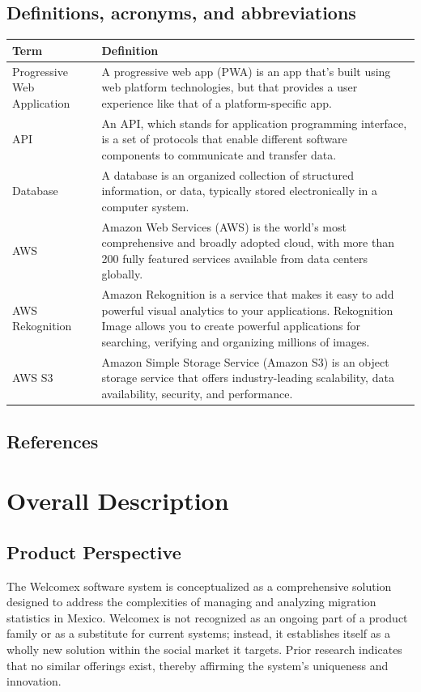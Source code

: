\documentclass{scrreprt}
\begin{document}
\section{Definitions, acronyms, and abbreviations}
\setlength{\arrayrulewidth}{0.5mm}
\setlength{\tabcolsep}{18pt}
\renewcommand{\arraystretch}{1.5}
\begin{tabular}{ |p{3cm}|p{9cm}|}
 \hline
  Term & Definition\\
 \hline
 Progressive Web Application & A progressive web app (PWA) is an app that's built using web platform technologies, but that provides a user experience like that of a platform-specific app.\\
 \hline
 API & An API, which stands for application programming interface, is a set of protocols that enable different software components to communicate and transfer data. \\
 \hline
 Database & A database is an organized collection of structured information, or data, typically stored electronically in a computer system.\\
  \hline
 AWS & Amazon Web Services (AWS) is the world’s most comprehensive and broadly adopted cloud, with more than 200 fully featured services available from data centers globally.\\
 \hline
 AWS Rekognition & Amazon Rekognition is a service that makes it easy to add powerful visual analytics to your applications. Rekognition Image allows you to create powerful applications for searching, verifying and organizing millions of images.\\
\hline
 AWS S3 & Amazon Simple Storage Service (Amazon S3) is an object storage service that offers industry-leading scalability, data availability, security, and performance.\\
 \hline
\end{tabular}

\section{References}








\chapter{Overall Description}
\section{Product Perspective}
The Welcomex software system is conceptualized as a comprehensive solution designed to address the complexities of managing and analyzing migration statistics in Mexico.  Welcomex is not recognized as an ongoing part of a product family or as a substitute for current systems; instead, it establishes itself as a wholly new solution within the social market it targets. Prior research indicates that no similar offerings exist, thereby affirming the system's uniqueness and innovation.
\end{document}
